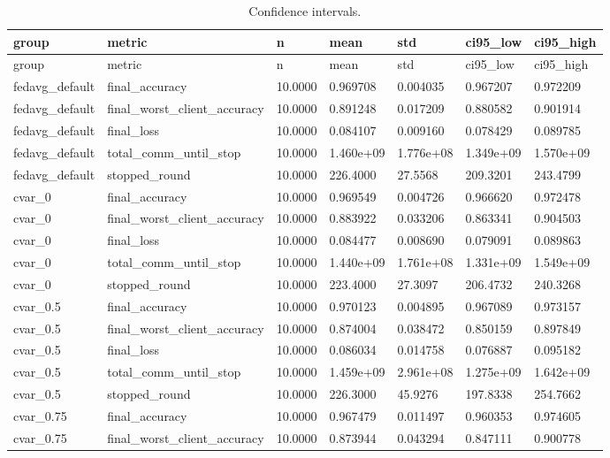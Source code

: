 \documentclass[11pt]{report}
\begin{document}
\begin{longtable}{lllllll}
\caption{Confidence intervals.}\\
\toprule
group & metric & n & mean & std & ci95\_low & ci95\_high \\
\midrule
\endfirsthead
\toprule
group & metric & n & mean & std & ci95\_low & ci95\_high \\
\midrule
\endhead
fedavg\_default & final\_accuracy & 10.0000 & 0.969708 & 0.004035 & 0.967207 & 0.972209 \\
fedavg\_default & final\_worst\_client\_accuracy & 10.0000 & 0.891248 & 0.017209 & 0.880582 & 0.901914 \\
fedavg\_default & final\_loss & 10.0000 & 0.084107 & 0.009160 & 0.078429 & 0.089785 \\
fedavg\_default & total\_comm\_until\_stop & 10.0000 & 1.460e+09 & 1.776e+08 & 1.349e+09 & 1.570e+09 \\
fedavg\_default & stopped\_round & 10.0000 & 226.4000 & 27.5568 & 209.3201 & 243.4799 \\
cvar\_0 & final\_accuracy & 10.0000 & 0.969549 & 0.004726 & 0.966620 & 0.972478 \\
cvar\_0 & final\_worst\_client\_accuracy & 10.0000 & 0.883922 & 0.033206 & 0.863341 & 0.904503 \\
cvar\_0 & final\_loss & 10.0000 & 0.084477 & 0.008690 & 0.079091 & 0.089863 \\
cvar\_0 & total\_comm\_until\_stop & 10.0000 & 1.440e+09 & 1.761e+08 & 1.331e+09 & 1.549e+09 \\
cvar\_0 & stopped\_round & 10.0000 & 223.4000 & 27.3097 & 206.4732 & 240.3268 \\
cvar\_0.5 & final\_accuracy & 10.0000 & 0.970123 & 0.004895 & 0.967089 & 0.973157 \\
cvar\_0.5 & final\_worst\_client\_accuracy & 10.0000 & 0.874004 & 0.038472 & 0.850159 & 0.897849 \\
cvar\_0.5 & final\_loss & 10.0000 & 0.086034 & 0.014758 & 0.076887 & 0.095182 \\
cvar\_0.5 & total\_comm\_until\_stop & 10.0000 & 1.459e+09 & 2.961e+08 & 1.275e+09 & 1.642e+09 \\
cvar\_0.5 & stopped\_round & 10.0000 & 226.3000 & 45.9276 & 197.8338 & 254.7662 \\
cvar\_0.75 & final\_accuracy & 10.0000 & 0.967479 & 0.011497 & 0.960353 & 0.974605 \\
cvar\_0.75 & final\_worst\_client\_accuracy & 10.0000 & 0.873944 & 0.043294 & 0.847111 & 0.900778 \\

\end{longtable}
\end{document}
